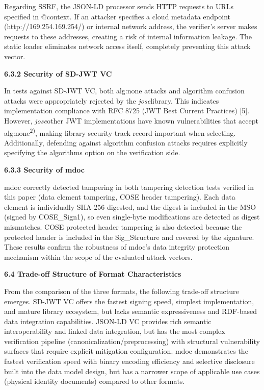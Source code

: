 Regarding SSRF, the JSON-LD processor sends HTTP requests to URLs specified in @context. If an attacker specifies a cloud metadata endpoint (http://169.254.169.254/) or internal network address, the verifier's server makes requests to these addresses, creating a risk of internal information leakage. The static loader eliminates network access itself, completely preventing this attack vector.

\textbf{6.3.2 Security of SD-JWT VC}

In tests against SD-JWT VC, both alg:none attacks and algorithm confusion attacks were appropriately rejected by the \emph{jose}library. This indicates implementation compliance with RFC 8725 (JWT Best Current Practices) {[}5{]}. However, \emph{jose}other JWT implementations have known vulnerabilities that accept alg:none\textsuperscript{2)}, making library security track record important when selecting. Additionally, defending against algorithm confusion attacks requires explicitly specifying the algorithms option on the verification side.

\textbf{6.3.3 Security of mdoc}

mdoc correctly detected tampering in both tampering detection tests verified in this paper (data element tampering, COSE header tampering). Each data element is individually SHA-256 digested, and the digest is included in the MSO (signed by COSE\_Sign1), so even single-byte modifications are detected as digest mismatches. COSE protected header tampering is also detected because the protected header is included in the Sig\_Structure and covered by the signature. These results confirm the robustness of mdoc's data integrity protection mechanism within the scope of the evaluated attack vectors.

\textbf{6.4 Trade-off Structure of Format Characteristics}

From the comparison of the three formats, the following trade-off structure emerges. SD-JWT VC offers the fastest signing speed, simplest implementation, and mature library ecosystem, but lacks semantic expressiveness and RDF-based data integration capabilities. JSON-LD VC provides rich semantic interoperability and linked data integration, but has the most complex verification pipeline (canonicalization/preprocessing) with structural vulnerability surfaces that require explicit mitigation configuration. mdoc demonstrates the fastest verification speed with binary encoding efficiency and selective disclosure built into the data model design, but has a narrower scope of applicable use cases (physical identity documents) compared to other formats.

